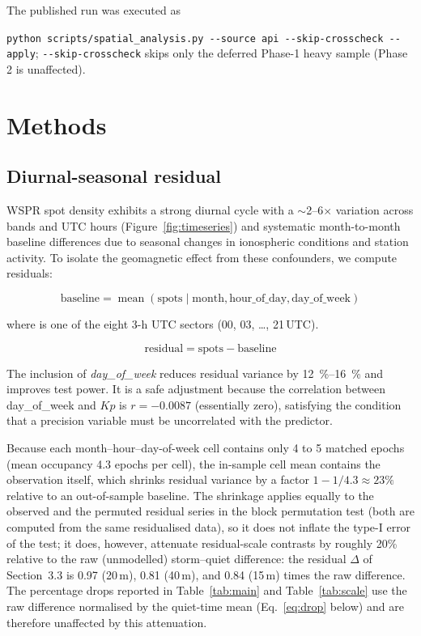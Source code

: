 \documentclass{agujournal2019}
\begin{document}
The published run was executed as
{\sloppy
\texttt{python scripts/spatial\_analysis.py -\kern0pt-source api -\kern0pt-skip-crosscheck -\kern0pt-apply};
\verb|--skip-crosscheck| skips only the deferred Phase-1 heavy sample
(Phase 2 is unaffected).
\par}

\section{Methods}

\subsection{Diurnal-seasonal residual}

WSPR spot density exhibits a strong diurnal cycle with a
$\sim$2--6$\times$ variation across bands and UTC hours
(Figure~\ref{fig:timeseries}) and systematic month-to-month baseline
differences due to seasonal changes in ionospheric conditions and station
activity. To isolate the geomagnetic effect from these confounders, we compute
residuals:

\begin{equation}
	\text{baseline} = \operatorname{mean}(\text{spots} \mid \text{month},
	\text{hour\_of\_day}, \text{day\_of\_week})
	\label{eq:baseline}
\end{equation}

where  is one of the eight 3-h UTC sectors
(00, 03, \ldots, 21\,UTC).

\begin{equation}
	\text{residual} = \text{spots} - \text{baseline}
	\label{eq:residual}
\end{equation}

The inclusion of \emph{day\_of\_week} reduces residual variance by
\SIrange{12}{16}{\percent} and improves test power. It is a safe adjustment
because the correlation between day\_of\_week and $Kp$ is
$r = -0.0087$ (essentially zero), satisfying the condition that a precision
variable must be uncorrelated with the predictor.

Because each month--hour--day-of-week cell contains only 4 to 5
matched epochs (mean occupancy 4.3 epochs per cell), the in-sample
cell mean contains the observation itself, which shrinks residual
variance by a factor $1 - 1/4.3 \approx 23\%$ relative to an
out-of-sample baseline. The shrinkage applies equally to the
observed and the permuted residual series in the block permutation
test (both are computed from the same residualised data), so it
does not inflate the type-I error of the test; it does, however,
attenuate residual-scale contrasts by roughly 20\% relative to the
raw (unmodelled) storm--quiet difference: the residual $\Delta$ of
Section~3.3 is 0.97 (20\,m), 0.81 (40\,m), and 0.84 (15\,m) times
the raw difference. The percentage drops reported in
Table~\ref{tab:main} and Table~\ref{tab:scale} use the raw
difference normalised by the quiet-time mean
(Eq.~\eqref{eq:drop} below) and are therefore unaffected by this
attenuation.
\end{document}
